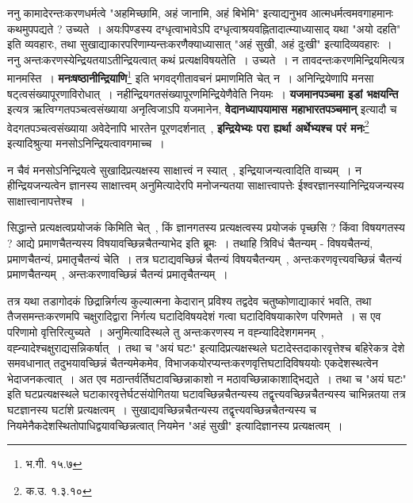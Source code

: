 	ननु कामादेरन्तःकरणधर्मत्वे  "अहमिच्छामि, अहं जानामि, अहं बिभेमि" इत्याद्यनुभव आत्मधर्मत्वमवगाहमानः कथमुपपद्यते ? उच्यते~। अयःपिण्डस्य दग्धृत्वाभावेऽपि दग्धृत्वाश्रयवह्नितादात्म्याध्यासाद् यथा "अयो दहति" इति व्यवहारः, तथा सुखाद्याकारपरिणाम्यन्तःकरणैक्याध्यासात् "अहं सुखी, अहं दुःखी" इत्यादिव्यवहारः~। ननु अन्तःकरणस्येन्द्रियतयाऽतीन्द्रियत्वात् कथं प्रत्यक्षविषयतेति~। उच्यते~। न तावदन्तःकरणमिन्द्रियमित्यत्र मानमस्ति~। {\bfseries मनःषष्ठानीन्द्रियाणि}\footnote{भ.गी. १५.७} इति भगवद्गीतावचनं प्रमाणमिति चेत् न~। अनिन्द्रियेणापि मनसा षट्त्वसंख्यापूरणाविरोधात्~। नहीन्द्रियगतसंख्यापूरणमिन्द्रियेणैवेति नियमः~। {\bfseries यजमानपञ्चमा इडां भक्षयन्ति} इत्यत्र ऋत्विग्गतपञ्चत्वसंख्याया अनृत्विजाऽपि यजमानेन, {\bfseries वेदानध्यापयामास महाभारतपञ्चमान्} इत्यादौ च वेदगतपञ्चत्वसंख्याया अवेदेनापि भारतेन पूरणदर्शनात्~, {\bfseries इन्द्रियेभ्यः परा ह्यर्था अर्थेभ्यश्च परं मनः}\footnote{क.उ. १.३.१०} इत्यादिश्रुत्या मनसोऽनिन्द्रियत्वावगमाच्च~। \par
	न चैवं मनसोऽनिन्द्रियत्वे सुखादिप्रत्यक्षस्य साक्षात्त्वं न स्यात्~, इन्द्रियाजन्यत्वादिति वाच्यम्~। न हीन्द्रियजन्यत्वेन ज्ञानस्य साक्षात्त्वम् अनुमित्यादेरपि मनोजन्यतया साक्षात्त्वापत्तेः ईश्वरज्ञानस्यानिन्द्रियजन्यस्य साक्षात्त्वानापत्तेश्च~। \par
	सिद्धान्ते प्रत्यक्षत्वप्रयोजकं किमिति चेत्~, किं ज्ञानगतस्य प्रत्यक्षत्वस्य प्रयोजकं पृच्छसि ? किंवा विषयगतस्य ? आद्ये प्रमाणचैतन्यस्य विषयावच्छिन्नचैतन्याभेद इति ब्रूमः~। तथाहि त्रिविधं चैतन्यम् - विषयचैतन्यं, प्रमाणचैतन्यं, प्रमातृचैतन्यं चेति~। तत्र घटाद्यवच्छिन्नं चैतन्यं विषयचैतन्यम्~, अन्तःकरणवृत्त्यवच्छिन्नं चैतन्यं प्रमाणचैतन्यम्~, अन्तःकरणावच्छिन्नं चैतन्यं प्रमातृचैतन्यम्~।\par
	तत्र यथा तडागोदकं छिद्रान्निर्गत्य कुल्यात्मना केदारान् प्रविश्य तद्वदेव चतुष्कोणाद्याकारं भवति, तथा तैजसमन्तःकरणमपि चक्षुरादिद्वारा निर्गत्य घटादिविषयदेशं गत्वा घटादिविषयाकारेण परिणमते~। स एव परिणामो वृत्तिरित्युच्यते~। अनुमित्यादिस्थले तु अन्तःकरणस्य न वह्न्यादिदेशगमनम्~, वह्न्यादेश्चक्षुराद्यसन्निकर्षात्~। तथा च "अयं घटः" इत्यादिप्रत्यक्षस्थले घटादेस्तदाकारवृत्तेश्च बहिरेकत्र देशे समवधानात् तदुभयावच्छिन्नं चैतन्यमेकमेव, विभाजकयोरप्यन्तःकरणवृत्तिघटादिविषययोः एकदेशस्थत्वेन भेदाजनकत्वात्~। अत एव मठान्तर्वर्तिघटावच्छिन्नाकाशो न मठावच्छिन्नाकाशाद्भिद्यते~। तथा च "अयं घटः" इति घटप्रत्यक्षस्थले घटाकारवृत्तेर्घटसंयोगितया घटावच्छिन्नचैतन्यस्य तद्वृत्त्यवच्छिन्नचैतन्यस्य चाभिन्नतया तत्र घटज्ञानस्य घटांंशे प्रत्यक्षत्वम्~। सुखाद्यवच्छिन्नचैतन्यस्य तद्वृत्त्यवच्छिन्नचैतन्यस्य च नियमेनैकदेशस्थितोपाधिद्वयावच्छिन्नत्वात् नियमेन "अहं सुखी" इत्यादिज्ञानस्य प्रत्यक्षत्वम्~।\par
